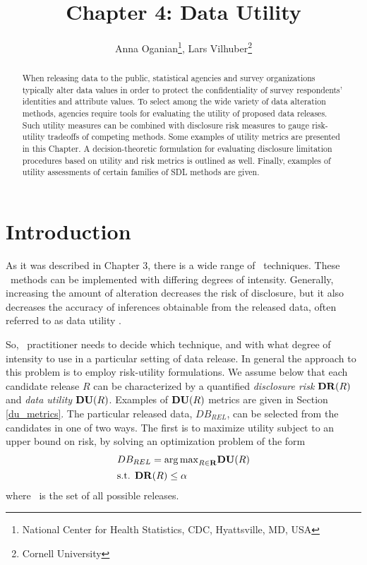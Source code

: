 \documentclass[12pt]{article}
\begin{document}
\title{Chapter 4: Data Utility}

\author{ Anna Oganian\thanks{National Center for Health Statistics, CDC, Hyattsville, MD, USA}, Lars Vilhuber\thanks{Cornell University}
}

\maketitle

\begin{abstract}
When releasing data to the public, statistical agencies and survey
organizations typically alter data values in order to protect the
confidentiality of survey respondents' identities and attribute
values.  To select among the wide variety of data alteration
methods, agencies require tools for evaluating the utility of
proposed data releases.  Such utility measures can be combined
with disclosure risk measures to gauge risk-utility tradeoffs of
competing methods.  Some examples of utility metrics are presented in this Chapter.
A  decision-theoretic formulation for evaluating
disclosure limitation procedures based on utility and risk metrics is outlined
as well. Finally, examples of utility assessments of certain families of SDL methods are 
given. 


\end{abstract}

\section{Introduction}\label{sec.intro}

As it was described in Chapter 3, there is a wide range of \SDL\ techniques.
These \SDL\ methods can be implemented with differing degrees of
intensity.  Generally, increasing the amount of alteration
decreases the risk of disclosure, but it also decreases the
accuracy of inferences obtainable from the released data, often
referred to as data utility \citep{Hund10}.

So,  \SDL\ practitioner needs to decide which technique, and with what
degree of intensity to use in a particular setting of data release. 
In general the approach to this problem is to employ risk-utility formulations. We assume
below that each candidate release $R$ can be characterized by a quantified
\textit{disclosure risk} $\mathbf{DR} (R)$ and \textit{data utility} $\mathbf{DU}
(R)$.  Examples of $\mathbf{DU}(R)$ metrics are given in Section \ref{du_metrics}.
The particular released data, $DB_{REL}$, can be selected from
the candidates in one of two ways. The first is to maximize
utility subject to an upper bound on risk, by solving an
optimization problem of the form
\begin{equation}\label{eq.opt}
\begin{array}{l}
DB_{REL} = {\arg\max}_{R \in \mathbf{R}} \mathbf{DU} (R) \\[1ex]
\mbox{s.t. } \mathbf{DR}(R) \leq \alpha
\end{array}
\end{equation}
where \RS\ is the set of all possible releases. 
\end{document}
